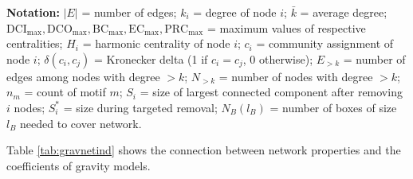\documentclass[preprint, 3p,
authoryear]{elsarticle} %
\begin{document}
\textbf{Notation:} \(|E|\) = number of edges; \(k_i\) = degree of node
\(i\); \(\bar{k}\) = average degree;
\(\text{DCI}_{\max}, \text{DCO}_{\max}, \text{BC}_{\max}, \text{EC}_{\max}, \text{PRC}_{\max}\)
= maximum values of respective centralities; \(H_i\) = harmonic
centrality of node \(i\); \(c_i\) = community assignment of node \(i\);
\(\delta(c_i, c_j)\) = Kronecker delta (1 if \(c_i = c_j\), 0
otherwise); \(E_{>k}\) = number of edges among nodes with degree
\(> k\); \(N_{>k}\) = number of nodes with degree \(> k\); \(n_m\) =
count of motif \(m\); \(S_i\) = size of largest connected component
after removing \(i\) nodes; \(S_i^*\) = size during targeted removal;
\(N_B(l_B)\) = number of boxes of size \(l_B\) needed to cover network.

Table \ref{tab:gravnetind} shows the connection between network
properties and the coefficients of gravity models.
\end{document}
